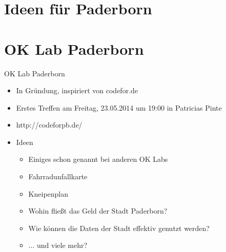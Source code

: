 \section{Ideen für Paderborn}

\section{OK Lab Paderborn}
\begin{frame}{OK Lab Paderborn}
 \begin{itemize}
  \item In Gründung, inspiriert von codefor.de \cite{codefor.de}
  \item Erstes Treffen am Freitag, 23.05.2014 um 19:00 in Patricias Pinte
  \item http://codeforpb.de/
  \item Ideen
  \begin{itemize}
   \item Einiges schon genannt bei anderen OK Labs
   \item Fahrradunfallkarte
   \item Kneipenplan
   \item Wohin fließt das Geld der Stadt Paderborn?
   \item Wie können die Daten der Stadt effektiv genutzt werden?
   \item $\dots$ und viele mehr?
  \end{itemize}
 \end{itemize}
\end{frame}
